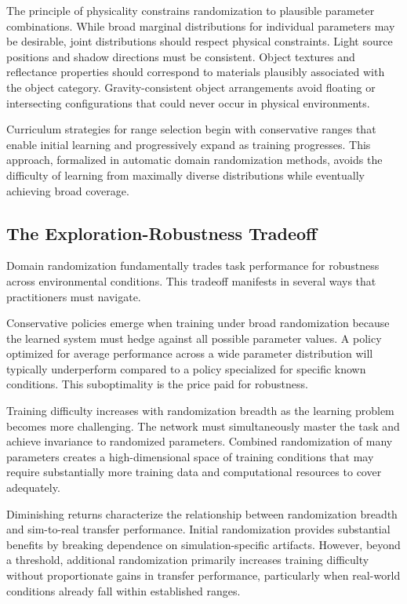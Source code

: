 The principle of physicality constrains randomization to plausible parameter combinations. While broad marginal distributions for individual parameters may be desirable, joint distributions should respect physical constraints. Light source positions and shadow directions must be consistent. Object textures and reflectance properties should correspond to materials plausibly associated with the object category. Gravity-consistent object arrangements avoid floating or intersecting configurations that could never occur in physical environments.

Curriculum strategies for range selection begin with conservative ranges that enable initial learning and progressively expand as training progresses. This approach, formalized in automatic domain randomization methods, avoids the difficulty of learning from maximally diverse distributions while eventually achieving broad coverage.

\subsection{The Exploration-Robustness Tradeoff}

Domain randomization fundamentally trades task performance for robustness across environmental conditions. This tradeoff manifests in several ways that practitioners must navigate.

Conservative policies emerge when training under broad randomization because the learned system must hedge against all possible parameter values. A policy optimized for average performance across a wide parameter distribution will typically underperform compared to a policy specialized for specific known conditions. This suboptimality is the price paid for robustness.

Training difficulty increases with randomization breadth as the learning problem becomes more challenging. The network must simultaneously master the task and achieve invariance to randomized parameters. Combined randomization of many parameters creates a high-dimensional space of training conditions that may require substantially more training data and computational resources to cover adequately.

Diminishing returns characterize the relationship between randomization breadth and sim-to-real transfer performance. Initial randomization provides substantial benefits by breaking dependence on simulation-specific artifacts. However, beyond a threshold, additional randomization primarily increases training difficulty without proportionate gains in transfer performance, particularly when real-world conditions already fall within established ranges.

